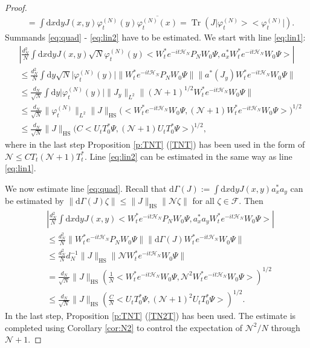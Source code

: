 \documentclass[11pt,a4paper,DIV11]{scrartcl}	%
\newcommand{\fock}{\mathcal{F}}		%
\newcommand{\di}{\textrm{d}}		%
\newcommand{\Ncal}{\mathcal{N}}		%
\newcommand{\Hcal}{\mathcal{H}}		%
\newcommand{\scal}[2]{\big<#1,#2\big>} %
\newcommand{\cc}[1]{\overline{#1}}	%
\newcommand{\norm}[1]{\lVert#1\rVert}	%
\newcommand{\ph}{\varphi_t^{(N)}}	%
\newcommand{\project}[1]{\lvert #1 \big>\big< #1\rvert}	%
\newcommand{\Tr}{\operatorname{Tr}}	%
\begin{document}
\begin{proof}
\begin{align*}
& = \int \di x\di y J(x,y) \ph(y) \cc{\ph(x)} = \Tr\left( J\project{\ph} \right).
\end{align*}
Summands \eqref{eq:quad} - \eqref{eq:lin2} have to be estimated. We start with line \eqref{eq:lin1}:
\begin{align*}
& \left\lvert \frac{d_N^2}{N} \int \di x\di y J(x,y) \sqrt{N} \ph(y) \scal{W^\ast_t e^{-it\Hcal_N} P_N W_0 \Psi}{a^\ast_x W^\ast_t e^{-it \Hcal_N} W_0 \Psi} \right\rvert \\
& \leq \frac{d_N^2}{N} \int \di y \sqrt{N} \lvert \ph(y)\rvert \norm{W^\ast_t e^{-it \Hcal_N} P_N W_0 \Psi} \norm{ a^\ast(J_y)W^\ast_t e^{-it \Hcal_N} W_0 \Psi} \\
& \leq \frac{d_N}{\sqrt{N}} \int \di y \lvert \ph(y)\rvert \norm{J_y}_{L^2} \norm{(\Ncal+1)^{1/2}W^\ast_t e^{-it\Hcal_N}W_0 \Psi} \\
& \leq \frac{d_N}{\sqrt{N}} \norm{\ph}_{L^2} \norm{J}_{\textrm{HS}} \Big( \scal{W^\ast_t e^{-it \Hcal_N}W_0 \Psi}{(\Ncal+1)W^\ast_t e^{-it\Hcal_N} W_0 \Psi} \Big)^{1/2} \\
& \leq \frac{d_N}{\sqrt{N}} \norm{J}_{\textrm{HS}} \Big(C \scal{U_t T^\ast_0 \Psi}{(\Ncal+1)U_t T^\ast_0 \Psi} \Big)^{1/2},
\end{align*}
where in the last step Proposition \ref{p:TNT} (\ref{TNT}) has been used in the form of $\Ncal \leq C T_t (\Ncal+1)T^\ast_t$.
Line \eqref{eq:lin2} can be estimated in the same way as line \eqref{eq:lin1}.

We now estimate line \eqref{eq:quad}. Recall that $\di\Gamma(J) := \int \di x\di y J(x,y) a^\ast_x a_y$ can be estimated by $\norm{\di\Gamma(J)\zeta} \leq \norm{J}_{\textrm{HS}} \norm{\Ncal \zeta}$ for all $\zeta \in \fock$. Then
\begin{align*}
& \left\lvert \frac{d_N^2}{N} \int \di x\di y J(x,y) \scal{W^\ast_t e^{-it\Hcal_N} P_N W_0 \Psi}{a^\ast_x a_y W^\ast_t e^{-it \Hcal_N}W_0 \Psi} \right\rvert \\
& \leq \frac{d_N^2}{N} \norm{W^\ast_t e^{-it\Hcal_N}P_N W_0 \Psi} \norm{\di\Gamma(J)W^\ast_t e^{-it \Hcal_N}W_0 \Psi} \\
& \leq \frac{d_N^2}{N} d_N^{-1} \norm{J}_{\textrm{HS}} \norm{\Ncal W^\ast_t e^{-it\Hcal_N}W_0 \Psi} \\
& = \frac{d_N}{\sqrt{N}} \norm{J}_{\textrm{HS}} \left( \frac{1}{N} \scal{W^\ast_t e^{-it\Hcal_N}W_0 \Psi}{\Ncal^2 W^\ast_t e^{-it\Hcal_N}W_0 \Psi} \right)^{1/2} \\
& \leq \frac{d_N}{\sqrt{N}} \norm{J}_{\textrm{HS}} \left( \frac{C}{N} \scal{U_t T^\ast_0 \Psi}{(\Ncal+1)^2 U_t T^\ast_0 \Psi} \right)^{1/2}.
\end{align*}
In the last step, Proposition \ref{p:TNT} (\ref{TN2T}) has been used. The estimate is completed using Corollary \ref{cor:N2} to control the expectation of $\Ncal^2/N$ through $\Ncal+1$.
\end{proof}
\end{document}
